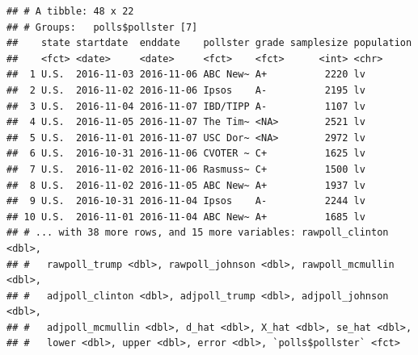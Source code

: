 \documentclass[
]{article}
\newenvironment{Shaded}{\begin{snugshade}}{\end{snugshade}}
\newcommand{\CommentTok}[1]{\textcolor[rgb]{0.56,0.35,0.01}{\textit{#1}}}
\newcommand{\DataTypeTok}[1]{\textcolor[rgb]{0.13,0.29,0.53}{#1}}
\newcommand{\DecValTok}[1]{\textcolor[rgb]{0.00,0.00,0.81}{#1}}
\newcommand{\FloatTok}[1]{\textcolor[rgb]{0.00,0.00,0.81}{#1}}
\newcommand{\KeywordTok}[1]{\textcolor[rgb]{0.13,0.29,0.53}{\textbf{#1}}}
\newcommand{\NormalTok}[1]{#1}
\newcommand{\OperatorTok}[1]{\textcolor[rgb]{0.81,0.36,0.00}{\textbf{#1}}}
\newcommand{\StringTok}[1]{\textcolor[rgb]{0.31,0.60,0.02}{#1}}
\begin{document}
\begin{Shaded}
\end{Shaded}

\begin{verbatim}
## # A tibble: 48 x 22
## # Groups:   polls$pollster [7]
##    state startdate  enddate    pollster grade samplesize population
##    <fct> <date>     <date>     <fct>    <fct>      <int> <chr>     
##  1 U.S.  2016-11-03 2016-11-06 ABC New~ A+          2220 lv        
##  2 U.S.  2016-11-02 2016-11-06 Ipsos    A-          2195 lv        
##  3 U.S.  2016-11-04 2016-11-07 IBD/TIPP A-          1107 lv        
##  4 U.S.  2016-11-05 2016-11-07 The Tim~ <NA>        2521 lv        
##  5 U.S.  2016-11-01 2016-11-07 USC Dor~ <NA>        2972 lv        
##  6 U.S.  2016-10-31 2016-11-06 CVOTER ~ C+          1625 lv        
##  7 U.S.  2016-11-02 2016-11-06 Rasmuss~ C+          1500 lv        
##  8 U.S.  2016-11-02 2016-11-05 ABC New~ A+          1937 lv        
##  9 U.S.  2016-10-31 2016-11-04 Ipsos    A-          2244 lv        
## 10 U.S.  2016-11-01 2016-11-04 ABC New~ A+          1685 lv        
## # ... with 38 more rows, and 15 more variables: rawpoll_clinton <dbl>,
## #   rawpoll_trump <dbl>, rawpoll_johnson <dbl>, rawpoll_mcmullin <dbl>,
## #   adjpoll_clinton <dbl>, adjpoll_trump <dbl>, adjpoll_johnson <dbl>,
## #   adjpoll_mcmullin <dbl>, d_hat <dbl>, X_hat <dbl>, se_hat <dbl>,
## #   lower <dbl>, upper <dbl>, error <dbl>, `polls$pollster` <fct>
\end{verbatim}

\begin{Shaded}
\end{Shaded}
\end{document}
